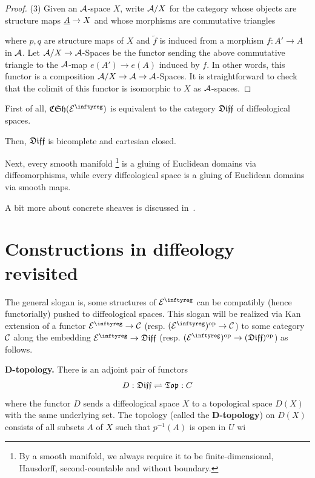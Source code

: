 \begin{proof}
  (3) Given an $\mathcal{A}$-space $X$,
  write $\mathcal{A}/X$ for the category whose objects are structure maps $\underline{A} \to X$ and whose morphisms are commutative triangles
  \begin{center}
  \end{center}
  where $p,q$ are structure maps of $X$ and $\tilde{f}$ is induced from a morphism $f:A' \to A$ in $\mathcal{A}$.
  Let $\mathcal{A}/X \to \mathcal{A}$-Spaces be the functor sending the above commutative triangle to the $\mathcal{A}$-map $e(A') \to e(A)$ induced by $f$.
  In other words, this functor is a composition $\mathcal{A}/X \to \mathcal{A} \to \mathcal{A}$-Spaces. It is straightforward to check that the colimit of this functor is isomorphic to $X$ as $\mathcal{A}$-spaces.
\end{proof}

\begin{corollary}
  First of all,
  $\CCSh(\cE^\infty)$ is equivalent to the category $\mathfrak{Diff}$ of diffeological spaces.

  Then,
  $\mathfrak{Diff}$ is bicomplete and cartesian closed.

  Next,
  every smooth manifold%
  \footnote{By a smooth manifold, we always require it to be finite-dimensional, Hausdorff, second-countable and without boundary.}
  is a gluing of Euclidean domains via diffeomorphisms,
  while every diffeological space is a gluing of Euclidean domains via smooth maps.
\end{corollary}
A bit more about concrete sheaves is discussed in~\cite{BH09}.

\section*{Constructions in diffeology revisited}

The general slogan is,
some structures of $\cE^\infty$ can be compatibly (hence functorially) pushed to diffeological spaces.
This slogan will be realized via Kan extension of a functor $\cE^\infty \to \cC$ (resp. $(\cE^\infty)^{\op} \to \cC$) to some category $\mathcal{C}$ along the embedding $\cE^\infty \to \Diff$ (resp. $(\cE^\infty)^{\op} \to (\Diff)^{\op}$) as follows.

\textbf{D-topology.}
There is an adjoint pair of functors
$$
  D:\mathfrak{Diff} \rightleftharpoons \mathfrak{Top}:C
$$
where the functor $D$ sends a diffeological space $X$ to a topological space $D(X)$ with the same underlying set.
The topology (called the \textbf{D-topology}) on $D(X)$ consists of all subsets $A$ of $X$ such that $p^{-1}(A)$ is open in $U$ wi

